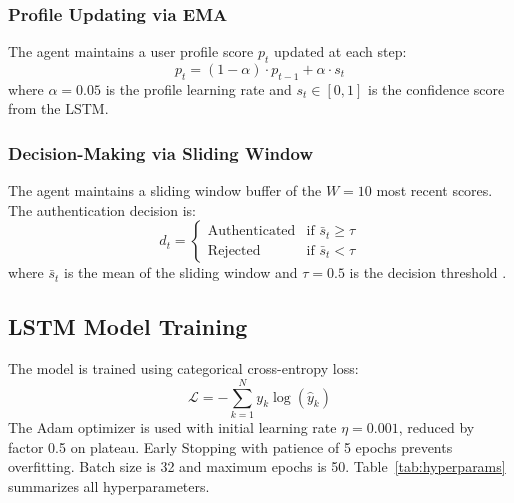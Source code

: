 \documentclass[3p,times,procedia]{elsarticle}
\begin{document}
\subsubsection{Profile Updating via EMA}
The agent maintains a user profile score $p_t$ updated at
each step:
\begin{equation}
    p_t = (1 - \alpha) \cdot p_{t-1} + \alpha \cdot s_t
    \label{eq:ema}
\end{equation}
where $\alpha = 0.05$ is the profile learning rate and
$s_t \in [0,1]$ is the confidence score from the LSTM.

\subsubsection{Decision-Making via Sliding Window}
The agent maintains a sliding window buffer of the $W = 10$
most recent scores. The authentication decision is:
\begin{equation}
    d_t =
    \begin{cases}
        \text{Authenticated} & \text{if } \bar{s}_t \geq \tau \\
        \text{Rejected}      & \text{if } \bar{s}_t < \tau
    \end{cases}
    \label{eq:decision}
\end{equation}
where $\bar{s}_t$ is the mean of the sliding window and
$\tau = 0.5$ is the decision threshold \cite{li_using_2019}.

\subsection{LSTM Model Training}

The model is trained using categorical cross-entropy loss:
\begin{equation}
    \mathcal{L} = -\sum_{k=1}^{N} y_k \log(\hat{y}_k)
    \label{eq:loss}
\end{equation}
The Adam optimizer is used with initial learning rate
$\eta = 0.001$, reduced by factor 0.5 on plateau. Early
Stopping with patience of 5 epochs prevents overfitting.
Batch size is 32 and maximum epochs is 50.
Table~\ref{tab:hyperparams} summarizes all hyperparameters.
\end{document}

